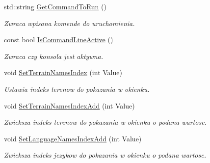 \begin{DoxyCompactItemize}
\mbox{\label{classtfp_1_1_interface_ae12dd144c8b641ca4f8db59d5806e2bc}} 
std\+::string \mbox{\hyperlink{classtfp_1_1_interface_ae12dd144c8b641ca4f8db59d5806e2bc}{Get\+Command\+To\+Run}} ()
\begin{DoxyCompactList}\small\item\em Zwraca wpisana komende do uruchomienia. \end{DoxyCompactList}\item 
\mbox{\label{classtfp_1_1_interface_ab3956789135af7b28eaa61c0df2ff7ed}} 
const bool \mbox{\hyperlink{classtfp_1_1_interface_ab3956789135af7b28eaa61c0df2ff7ed}{Is\+Command\+Line\+Active}} ()
\begin{DoxyCompactList}\small\item\em Zwraca czy konsola jest aktywna. \end{DoxyCompactList}\item 
\mbox{\label{classtfp_1_1_interface_a1559076ea0db2d085fcd5c8e458ffeaa}} 
void \mbox{\hyperlink{classtfp_1_1_interface_a1559076ea0db2d085fcd5c8e458ffeaa}{Set\+Terrain\+Names\+Index}} (int Value)
\begin{DoxyCompactList}\small\item\em Ustawia indeks terenow do pokazania w okienku. \end{DoxyCompactList}\item 
\mbox{\label{classtfp_1_1_interface_ab7961eb7aa1373dc554b7ea130c2cd0f}} 
void \mbox{\hyperlink{classtfp_1_1_interface_ab7961eb7aa1373dc554b7ea130c2cd0f}{Set\+Terrain\+Names\+Index\+Add}} (int Value)
\begin{DoxyCompactList}\small\item\em Zwieksza indeks terenow do pokazania w okienku o podana wartosc. \end{DoxyCompactList}\item 
\mbox{\label{classtfp_1_1_interface_a0f465cb38e146bac8efa4808b6784227}} 
void \mbox{\hyperlink{classtfp_1_1_interface_a0f465cb38e146bac8efa4808b6784227}{Set\+Language\+Names\+Index\+Add}} (int Value)
\begin{DoxyCompactList}\small\item\em Zwieksza indeks jezykow do pokazania w okienku o podana wartosc. \end{DoxyCompactList}\item 

\end{DoxyCompactItemize}
